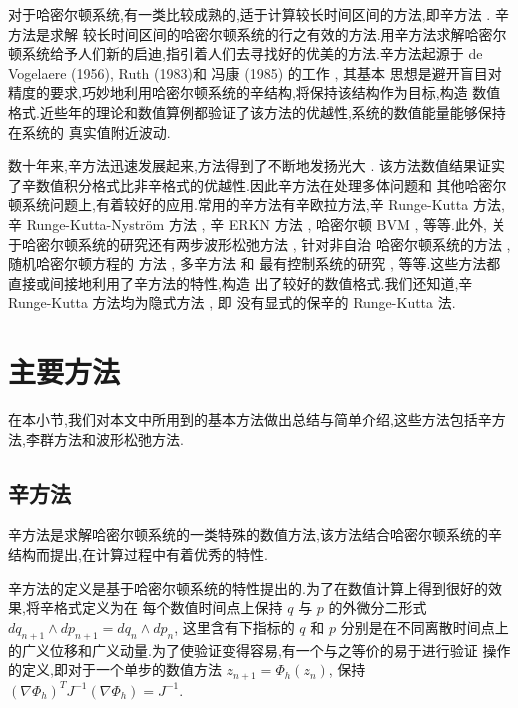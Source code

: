 对于哈密尔顿系统,有一类比较成熟的,适于计算较长时间区间的方法,即辛方法 \cite{feng2010symplectic}. 辛方法是求解
较长时间区间的哈密尔顿系统的行之有效的方法.用辛方法求解哈密尔顿系统给予人们新的启迪,指引着人们去寻找好的优美的方法.辛方法起源于
de Vogelaere (1956), Ruth (1983)和 冯康 (1985) 的工作 \cite{hairer2006geometric}, 其基本
思想是避开盲目对精度的要求,巧妙地利用哈密尔顿系统的辛结构,将保持该结构作为目标,构造
数值格式.近些年的理论和数值算例都验证了该方法的优越性,系统的数值能量能够保持在系统的
真实值附近波动.

数十年来,辛方法迅速发展起来,方法得到了不断地发扬光大 \cite{calvo1994numerical,leimkuhler2004simulating,hong2006multi,yang2009extended,monovasilis2013exponentially,xin2016birkhoffian,michalas2016numerical,liao2016multi}. 该方法数值结果证实了辛数值积分格式比非辛格式的优越性.因此辛方法在处理多体问题和
其他哈密尔顿系统问题上,有着较好的应用.常用的辛方法有辛欧拉方法,辛 Runge-Kutta 方法,
辛 Runge-Kutta-Nystr{\"o}m 方法 \cite{kalogiratou2014fourth,kalogiratou2015}, 辛 ERKN
方法 \cite{wang2014ahigh}, 哈密尔顿 BVM \cite{brugnano2014multi}, 等等.此外,
关于哈密尔顿系统的研究还有两步波形松弛方法 \cite{hassanzadeh2014two}, 针对非自治
哈密尔顿系统的方法 \cite{hong2000numerical,zhang2010anote}, 随机哈密尔顿方程的
方法 \cite{burrage2014structure,ma2015sto,fan2015using}, 多辛方法 \cite{wang2013multi} 和
最有控制系统的研究 \cite{li2015asym}, 等等.这些方法都直接或间接地利用了辛方法的特性,构造
出了较好的数值格式.我们还知道,辛 Runge-Kutta 方法均为隐式方法 \cite{sanz1988runge}, 即
没有显式的保辛的 Runge-Kutta 法.

\section{主要方法}
在本小节,我们对本文中所用到的基本方法做出总结与简单介绍,这些方法包括辛方法,李群方法和波形松弛方法.

\subsection{辛方法}

辛方法是求解哈密尔顿系统的一类特殊的数值方法,该方法结合哈密尔顿系统的辛结构而提出,在计算过程中有着优秀的特性.

辛方法的定义是基于哈密尔顿系统的特性提出的.为了在数值计算上得到很好的效果,将辛格式定义为在
每个数值时间点上保持 $q$ 与 $p$ 的外微分二形式 $dq_{n+1}\wedge dp_{n+1}=dq_n\wedge dp_n$, 这里含有下指标的 $q$ 和 $p$
分别是在不同离散时间点上的广义位移和广义动量.为了使验证变得容易,有一个与之等价的易于进行验证
操作的定义,即对于一个单步的数值方法 $z_{n+1}=\Phi_h(z_n)$, 保持 $(\nabla\Phi_h)^TJ^{-1}(\nabla\Phi_h)=J^{-1}$.

